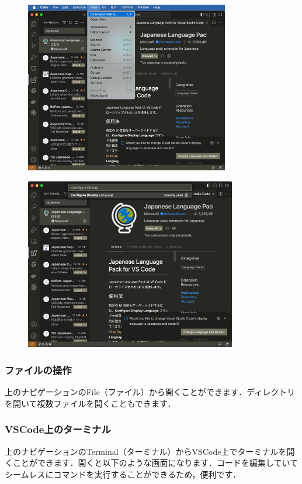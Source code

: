 \documentclass{jarticle}
\begin{document}
\begin{figure}[H]
  \centering
  \includegraphics[height=7.5cm]{fig/VSCode3.png}
\end{figure}
\begin{figure}[H]
  \centering
  \includegraphics[height=7.5cm]{fig/VSCode4.png}
\end{figure}

\subsubsection{ファイルの操作}
上のナビゲーションのFile（ファイル）から開くことができます．ディレクトリを開いて複数ファイルを開くこともできます．

\subsubsection{VSCode上のターミナル}
上のナビゲーションのTerminal（ターミナル）からVSCode上でターミナルを開くことができます．開くと以下のような画面になります．コードを編集していてシームレスにコマンドを実行することができるため，便利です．
\end{document}
